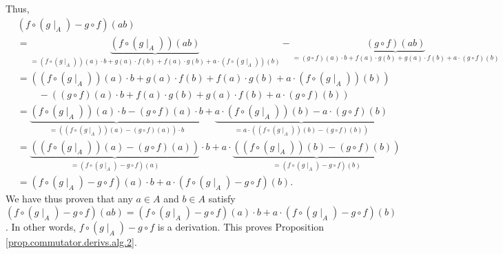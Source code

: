 \documentclass[etingof-lie.tex]{subfiles}
\begin{document}
\begin{verlong}
Thus,%
\begin{align*}
&  \left(  f\circ\left(  g\mid_{A}\right)  -g\circ f\right)  \left(  ab\right)
\\
&  =\underbrace{\left(  f\circ\left(  g\mid_{A}\right)  \right)  \left(
ab\right)  }_{=\left(  f\circ\left(  g\mid_{A}\right)  \right)  \left(
a\right)  \cdot b+g\left(  a\right)  \cdot f\left(  b\right)  +f\left(
a\right)  \cdot g\left(  b\right)  +a\cdot\left(  f\circ\left(  g\mid
_{A}\right)  \right)  \left(  b\right)  }-\underbrace{\left(  g\circ f\right)
\left(  ab\right)  }_{=\left(  g\circ f\right)  \left(  a\right)  \cdot
b+f\left(  a\right)  \cdot g\left(  b\right)  +g\left(  a\right)  \cdot
f\left(  b\right)  +a\cdot\left(  g\circ f\right)  \left(  b\right)  }\\
&  =\left(  \left(  f\circ\left(  g\mid_{A}\right)  \right)  \left(  a\right)
\cdot b+g\left(  a\right)  \cdot f\left(  b\right)  +f\left(  a\right)  \cdot
g\left(  b\right)  +a\cdot\left(  f\circ\left(  g\mid_{A}\right)  \right)
\left(  b\right)  \right) \\
&  \ \ \ \ \ \ \ \ \ \ -\left(  \left(  g\circ f\right)  \left(  a\right)
\cdot b+f\left(  a\right)  \cdot g\left(  b\right)  +g\left(  a\right)  \cdot
f\left(  b\right)  +a\cdot\left(  g\circ f\right)  \left(  b\right)  \right)
\\
&  =\underbrace{\left(  f\circ\left(  g\mid_{A}\right)  \right)  \left(
a\right)  \cdot b-\left(  g\circ f\right)  \left(  a\right)  \cdot
b}_{=\left(  \left(  f\circ\left(  g\mid_{A}\right)  \right)  \left(
a\right)  -\left(  g\circ f\right)  \left(  a\right)  \right)  \cdot
b}+\underbrace{a\cdot\left(  f\circ\left(  g\mid_{A}\right)  \right)  \left(
b\right)  -a\cdot\left(  g\circ f\right)  \left(  b\right)  }_{=a\cdot\left(
\left(  f\circ\left(  g\mid_{A}\right)  \right)  \left(  b\right)  -\left(
g\circ f\right)  \left(  b\right)  \right)  }\\
&  =\underbrace{\left(  \left(  f\circ\left(  g\mid_{A}\right)  \right)
\left(  a\right)  -\left(  g\circ f\right)  \left(  a\right)  \right)
}_{=\left(  f\circ\left(  g\mid_{A}\right)  -g\circ f\right)  \left(
a\right)  }\cdot b+a\cdot\underbrace{\left(  \left(  f\circ\left(  g\mid
_{A}\right)  \right)  \left(  b\right)  -\left(  g\circ f\right)  \left(
b\right)  \right)  }_{=\left(  f\circ\left(  g\mid_{A}\right)  -g\circ
f\right)  \left(  b\right)  }\\
&  =\left(  f\circ\left(  g\mid_{A}\right)  -g\circ f\right)  \left(
a\right)  \cdot b+a\cdot\left(  f\circ\left(  g\mid_{A}\right)  -g\circ
f\right)  \left(  b\right)  .
\end{align*}
We have thus proven that any $a\in A$ and $b\in A$ satisfy $\left(
f\circ\left(  g\mid_{A}\right)  -g\circ f\right)  \left(  ab\right)  =\left(
f\circ\left(  g\mid_{A}\right)  -g\circ f\right)  \left(  a\right)  \cdot
b+a\cdot\left(  f\circ\left(  g\mid_{A}\right)  -g\circ f\right)  \left(
b\right)  $. In other words, $f\circ\left(  g\mid_{A}\right)  -g\circ f$ is a
derivation. This proves Proposition \ref{prop.commutator.derivs.alg.2}.


\end{verlong}
\end{document}

